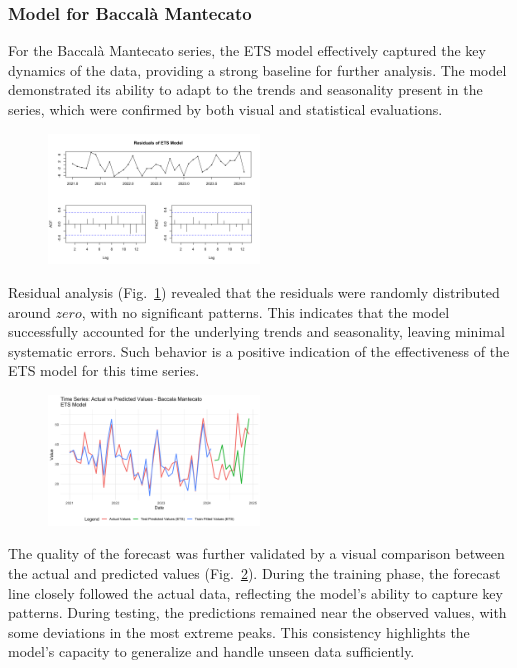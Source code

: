\documentclass[10pt,twocolumn,letterpaper]{article}
\begin{document}
\subsubsection{Model for Baccalà Mantecato}
For the Baccalà Mantecato series, the ETS model effectively captured the key dynamics of the data, providing a strong baseline for further analysis. The model demonstrated its ability to adapt to the trends and seasonality present in the series, which were confirmed by both visual and statistical evaluations.
\begin{figure}[h!]
    \centering
    \includegraphics[width=0.5\textwidth]{PlotsBEFD/Residuals_ETS_M.png} 
    \caption{}
    \label{fig:Residuals_ETS_M}
\end{figure}
Residual analysis (Fig.~\ref{fig:Residuals_ETS_M}) revealed that the residuals were randomly distributed around $zero$, with no significant patterns. This indicates that the model successfully accounted for the underlying trends and seasonality, leaving minimal systematic errors. Such behavior is a positive indication of the effectiveness of the ETS model for this time series.
\begin{figure}[h!]
    \centering
    \includegraphics[width=0.5\textwidth]{PlotsBEFD/TS_M_ETS.png} 
    \caption{}
    \label{fig:TS_M_ETS}
\end{figure}

The quality of the forecast was further validated by a visual comparison between the actual and predicted values (Fig.~\ref{fig:TS_M_ETS}). During the training phase, the forecast line closely followed the actual data, reflecting the model's ability to capture key patterns. During testing, the predictions remained near the observed values, with some deviations in the most extreme peaks. This consistency highlights the model's capacity to generalize and handle unseen data sufficiently.
\end{document}
